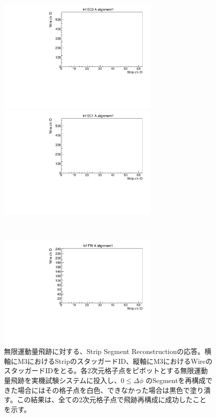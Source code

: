 \begin{figure}
    \begin{minipage}[b]{.5\linewidth}
        \centering
        \includegraphics[height=5.6cm]{fig/Test/A_InfEC0_strip.pdf}
    \end{minipage}
    \begin{minipage}[b]{.5\linewidth}
        \centering
        \includegraphics[height=5.6cm]{fig/Test/A_InfEC1_strip.pdf}
    \end{minipage}\\
    \begin{minipage}[b]{\linewidth}
        \centering
        \includegraphics[height=5.6cm]{fig/Test/A_InfFW_strip.pdf}
    \end{minipage}
    \caption[無限運動量飛跡に対する、Strip Segment Reconstructionの応答]{無限運動量飛跡に対する、Strip Segment Reconstructionの応答。横軸にM3におけるStripのスタッガードID、縦軸にM3におけるWireのスタッガードIDをとる。各2次元格子点をピボットとする無限運動量飛跡を実機試験システムに投入し、$0 \leq \Delta\phi$ のSegmentを再構成できた場合にはその格子点を白色、できなかった場合は黒色で塗り潰す。この結果は、全ての2次元格子点で飛跡再構成に成功したことを示す。}
    \label{Inf_A_Strip}
\end{figure}

